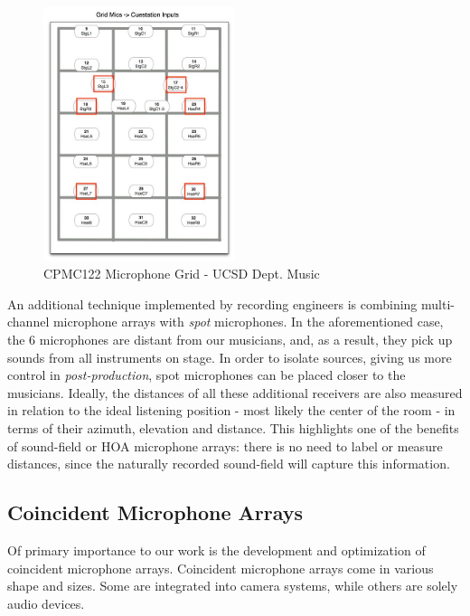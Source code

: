 \begin{figure}[h!]%
\centering
\includegraphics[width=0.5\textwidth]{img/cpmc122-mics.jpg} 
\caption{CPMC122 Microphone Grid - UCSD Dept. Music}
\label{fig:cpmc122-mic-grid}
\end{figure}

An additional technique implemented by recording engineers is combining multi-channel microphone arrays with \textit{spot} microphones. In the aforementioned case, the 6 microphones are distant from our musicians, and, as a result, they pick up sounds from all instruments on stage. In order to isolate sources, giving us more control in \textit{post-production}, spot microphones can be placed closer to the musicians. Ideally, the distances of all these additional receivers are also measured in relation to the ideal listening position - most likely the center of the room - in terms of their azimuth, elevation and distance. This highlights one of the benefits of sound-field or HOA microphone arrays: there is no need to label or measure distances, since the naturally recorded sound-field will capture this information.  

\subsection{Coincident Microphone Arrays}

Of primary importance to our work is the development and optimization of coincident microphone arrays. Coincident microphone arrays come in various shape and sizes. Some are integrated into camera systems, while others are solely audio devices. 

